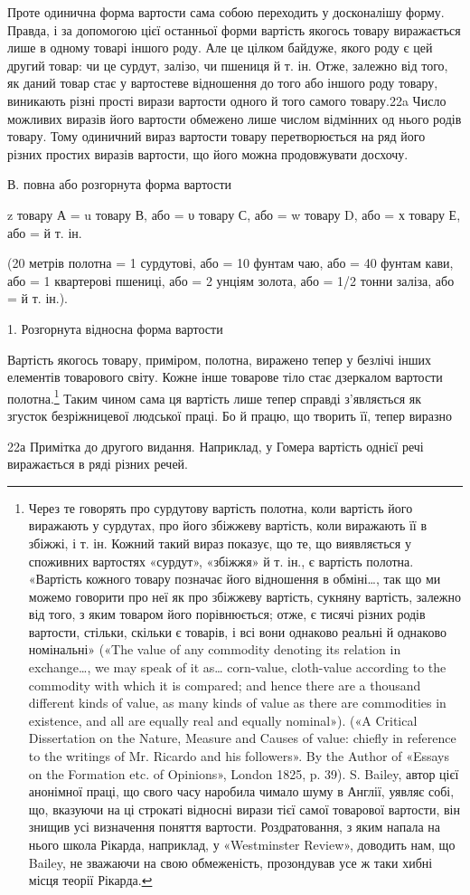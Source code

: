 Проте одинична форма вартости сама собою переходить у досконалішу
форму. Правда, і за допомогою цієї останньої форми вартість
якогось товару виражається лише в одному товарі іншого
роду. Але це цілком байдуже, якого роду є цей другий товар: чи
це сурдут, залізо, чи пшениця й т. ін. Отже, залежно від того,
як даний товар стає у вартостеве відношення до того або іншого
роду товару, виникають різні прості вирази вартости одного й
того самого товару.22a Число можливих виразів його вартости
обмежено лише числом відмінних од нього родів товару. Тому
одиничний вираз вартости товару перетворюється на ряд його
різних простих виразів вартости, що його можна продовжувати
досхочу.

В. повна або розгорнута форма вартости

z товару А = u товару В, або = υ товару С, або = w товару D,
або = х товару Е, або = й т. ін.

(20 метрів полотна = 1 сурдутові, або = 10 фунтам чаю, або = 40 фунтам
кави, або = 1 квартерові пшениці, або = 2 унціям золота, або = 1/2 тонни
заліза, або = й т. ін.).

1. Розгорнута відносна форма вартости

Вартість якогось товару, приміром, полотна, виражено тепер
у безлічі інших елементів товарового світу. Кожне інше товарове
тіло стає дзеркалом вартости полотна.\footnote{
Через те говорять про сурдутову вартість полотна, коли вартість
його виражають у сурдутах, про його збіжжеву вартість, коли виражають
її в збіжжі, і т. ін. Кожний такий вираз показує, що те, що виявляється
у споживних вартостях «сурдут», «збіжжя» й т. ін., є вартість полотна.
«Вартість кожного товару позначає його відношення в обміні…,
так що ми можемо говорити про неї як про збіжжеву вартість, сукняну
вартість, залежно від того, з яким товаром його порівнюється; отже, є
тисячі різних родів вартости, стільки, скільки є товарів, і всі вони однаково
реальні й однаково номінальні» («The value of any commodity denoting
its relation in exchange…, we may speak of it as… corn-value,
cloth-value according to the commodity with which it is compared; and
hence there are a thousand different kinds of value, as many kinds
of value as there are commodities in existence, and all are equally real
and equally nominal»). («A Critical Dissertation on the Nature, Measure
and Causes of value: chiefly in reference to the writings of Mr. Ricardo
and his followers». By the Author of «Essays on the Formation etc. of Opinions»,
London 1825, p. 39). S. Bailey, автор цієї анонімної праці, що
свого часу наробила чимало шуму в Англії, уявляє собі, що, вказуючи
на ці строкаті відносні вирази тієї самої товарової вартости, він знищив
усі визначення поняття вартости. Роздратовання, з яким напала на нього
школа Рікарда, наприклад, у «Westminster Review», доводить нам, що
Bailey, не зважаючи на свою обмеженість, прозондував усе ж таки
хибні місця теорії Рікарда.
} Таким чином сама ця
вартість лише тепер справді з’являється як згусток безріжницевої
людської праці. Бо й працю, що творить її, тепер виразно

22а Примітка до другого видання. Наприклад, у Гомера вартість
однієї речі виражається в ряді різних речей.
\parbreak{}  %
